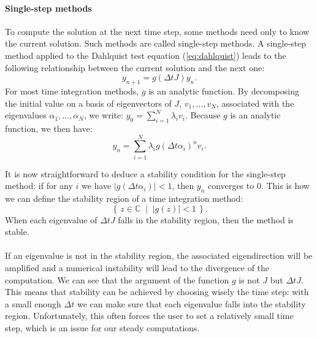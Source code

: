         \paragraph{Single-step methods}
        To compute the solution at the next time step, some methods need only to know the current solution.
        Such methods are called single-step methods.
        A single-step method applied to the Dahlquist test equation (\ref{eq:dahlquist}) leads to the following relationship between the current solution and the next one:
        \begin{equation}\label{eq:single_step}
          y_{n+1} = g\left(\Delta tJ\right)y_n .
        \end{equation}
        For most time integration methods, $g$ is an analytic function.
        By decomposing the initial value on a basis of eigenvectors of $J$, $v_1, \dots, v_N$, associated with the eigenvalues $\alpha_1, \dots, \alpha_N$, we write: $y_0 = \sum_{i=1}^N \lambda_i v_i$.
        Because $g$ is an analytic function, we then have:
        \begin{equation}
          y_n = \sum_{i=1}^N \lambda_i g\left(\Delta t \alpha_i\right)^n v_i .
        \end{equation}

        It is now straightforward to deduce a stability condition for the single-step method: if for any $i$ we have $\left|g\left(\Delta t\alpha_i\right)\right| < 1$, then $y_n$ converges to 0.
        This is how we can define the stability region of a time integration method:
        \begin{equation}
          \left\{ \, z \in \mathbb{C} \; \mid \; \left| g\left(z\right) \right| < 1 \, \right\} .
        \end{equation}
        When each eigenvalue of $\Delta t J$ falls in the stability region, then the method is stable.

        \paragraph{}
        If an eigenvalue is not in the stability region, the associated eigendirection will be amplified and a numerical instability will lead to the divergence of the computation.
        We can see that the argument of the function $g$ is not $J$ but $\Delta t J$.
        This means that stability can be achieved by choosing wisely the time step: with a small enough $\Delta t$ we can make sure that each eigenvalue falls into the stability region.
        Unfortunately, this often forces the user to set a relatively small time step, which is an issue for our steady computations.


